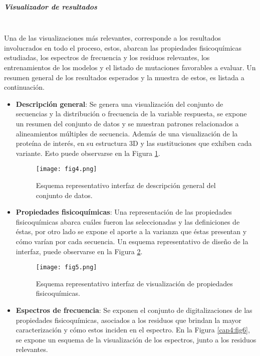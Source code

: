 \subparagraph{Visualizador de resultados\\\\}

Una de las visualizaciones más relevantes, corresponde a los resultados involucrados en todo el proceso, estos, abarcan las propiedades fisicoquímicas estudiadas, los espectros de frecuencia y los residuos relevantes, los entrenamientos de los modelos y el listado de mutaciones favorables a evaluar. Un resumen general de los resultados esperados y la muestra de estos, es listada a continuación.

\begin{itemize}
	
	\item \textbf{Descripción general}: Se genera una visualización del conjunto de secuencias y la distribución o frecuencia de la variable respuesta, se expone un resumen del conjunto de datos y se muestran patrones relacionados a alineamientos múltiples de secuencia. Además de una visualización de la proteína de interés, en su estructura 3D y las sustituciones que exhiben cada variante. Esto puede observarse en la Figura \ref{cap4:fig4}.
	
	\begin{figure}[!h]
		
		\centering
		\texttt{[image: fig4.png]}
		\caption{Esquema representativo interfaz de descripción general del conjunto de datos.}
		\label{cap4:fig4}
	\end{figure}
	
	
	\item \textbf{Propiedades fisicoquímicas}: Una representación de las propiedades fisicoquímicas abarca cuáles fueron las seleccionadas y las definiciones de éstas, por otro lado se expone el aporte a la varianza que éstas presentan y cómo varían por cada secuencia. Un esquema representativo de diseño de la interfaz, puede observarse en la Figura \ref{cap4:fig5}.
	
	\begin{figure}[!h]
		
		\centering
		\texttt{[image: fig5.png]}
		\caption{Esquema representativo interfaz de visualización de propiedades fisicoquímicas.}
		\label{cap4:fig5}
	\end{figure}
	
	\item \textbf{Espectros de frecuencia}: Se exponen el conjunto de digitalizaciones de las propiedades fisicoquímicas, asociados a los residuos que brindan la mayor caracterización y cómo estos inciden en el espectro. En la Figura \ref{cap4:fig6}, se expone un esquema de la visualización de los espectros, junto a los residuos relevantes.
	

\end{itemize}

